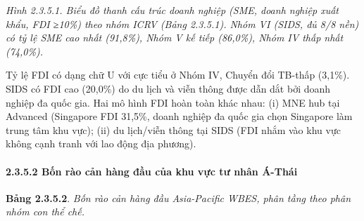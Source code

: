 \documentclass[
  a4paper,
  13pt]{extreport}
\begin{document}
\emph{Hình 2.3.5.1. Biểu đồ thanh cấu trúc doanh nghiệp (SME, doanh
nghiệp xuất khẩu, FDI ≥10\%) theo nhóm ICRV (Bảng 2.3.5.1). Nhóm VI
(SIDS, đủ 8/8 nền) có tỷ lệ SME cao nhất (91,8\%), Nhóm V kế tiếp
(86,0\%), Nhóm IV thấp nhất (74,0\%).}

Tỷ lệ FDI có dạng chữ U với cực tiểu ở Nhóm IV, Chuyển đổi TB-thấp
(3,1\%). SIDS có FDI cao (20,0\%) do du lịch và viễn thông được dẫn dắt
bởi doanh nghiệp đa quốc gia. Hai mô hình FDI hoàn toàn khác nhau: (i)
MNE hub tại Advanced (Singapore FDI 31,5\%, doanh nghiệp đa quốc gia
chọn Singapore làm trung tâm khu vực); (ii) du lịch/viễn thông tại SIDS
(FDI nhắm vào khu vực không cạnh tranh với lao động địa phương).

\hypertarget{bux1ed1n-ruxe0o-cux1ea3n-huxe0ng-ux111ux1ea7u-cux1ee7a-khu-vux1ef1c-tux1b0-nhuxe2n-uxe1-thuxe1i}{%
\paragraph{2.3.5.2 Bốn rào cản hàng đầu của khu vực tư nhân
Á-Thái}\label{bux1ed1n-ruxe0o-cux1ea3n-huxe0ng-ux111ux1ea7u-cux1ee7a-khu-vux1ef1c-tux1b0-nhuxe2n-uxe1-thuxe1i}}

\textbf{Bảng 2.3.5.2}. \emph{Bốn rào cản hàng đầu Asia-Pacific WBES,
phân tầng theo phân nhóm con thể chế.}
\end{document}
